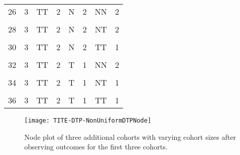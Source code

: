\begin{table}[H]
{\begin{tabular}[t]{cccccccc}
			26 & 3 & TT & 2 & N & 2 & NN & 2\\
			\cellcolor{gray!6}{27} & \cellcolor{gray!6}{3} & \cellcolor{gray!6}{TT} & \cellcolor{gray!6}{2} & \cellcolor{gray!6}{N} & \cellcolor{gray!6}{2} & \cellcolor{gray!6}{NT} & \cellcolor{gray!6}{2}\\
			28 & 3 & TT & 2 & N & 2 & NT & 2\\
			\cellcolor{gray!6}{29} & \cellcolor{gray!6}{3} & \cellcolor{gray!6}{TT} & \cellcolor{gray!6}{2} & \cellcolor{gray!6}{N} & \cellcolor{gray!6}{2} & \cellcolor{gray!6}{TT} & \cellcolor{gray!6}{1}\\
			30 & 3 & TT & 2 & N & 2 & TT & 1\\
			\cellcolor{gray!6}{31} & \cellcolor{gray!6}{3} & \cellcolor{gray!6}{TT} & \cellcolor{gray!6}{2} & \cellcolor{gray!6}{T} & \cellcolor{gray!6}{1} & \cellcolor{gray!6}{NN} & \cellcolor{gray!6}{2}\\
			32 & 3 & TT & 2 & T & 1 & NN & 2\\
			\cellcolor{gray!6}{33} & \cellcolor{gray!6}{3} & \cellcolor{gray!6}{TT} & \cellcolor{gray!6}{2} & \cellcolor{gray!6}{T} & \cellcolor{gray!6}{1} & \cellcolor{gray!6}{NT} & \cellcolor{gray!6}{1}\\
			34 & 3 & TT & 2 & T & 1 & NT & 1\\
			\cellcolor{gray!6}{35} & \cellcolor{gray!6}{3} & \cellcolor{gray!6}{TT} & \cellcolor{gray!6}{2} & \cellcolor{gray!6}{T} & \cellcolor{gray!6}{1} & \cellcolor{gray!6}{TT} & \cellcolor{gray!6}{1}\\
			36 & 3 & TT & 2 & T & 1 & TT & 1\\
			\bottomrule
	\end{tabular}}
\end{table}

\begin{figure}[h!]
	\centering
	\caption[DTP node plot for three additional various sized cohorts.]{Node plot of three additional cohorts with varying cohort sizes after observing outcomes for the first three cohorts.}
	\label{fig_tite-dtp:NonUniformDTPNode4-7}
	\texttt{[image: TITE-DTP-NonUniformDTPNode]}
\end{figure}

